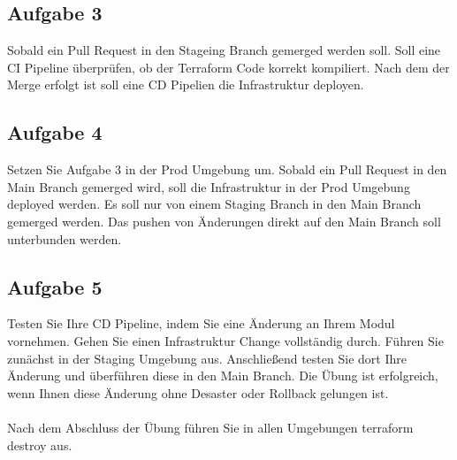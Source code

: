 \documentclass{article}
\begin{document}
    \subsection{Aufgabe 3}
    Sobald ein Pull Request in den Stageing Branch gemerged werden soll.  Soll eine CI Pipeline überprüfen, ob der Terraform Code korrekt kompiliert.
    Nach dem der Merge erfolgt ist soll eine CD Pipelien die Infrastruktur deployen.

    \subsection{Aufgabe 4}
    Setzen Sie Aufgabe 3 in der Prod Umgebung um. Sobald ein Pull Request in den Main Branch gemerged wird, soll die Infrastruktur in der Prod Umgebung deployed werden.
    Es soll nur von einem Staging Branch in den Main Branch gemerged werden. Das pushen von Änderungen direkt auf den Main Branch soll unterbunden werden.

    \subsection{Aufgabe 5}
    Testen Sie Ihre CD Pipeline, indem Sie eine Änderung an Ihrem Modul vornehmen.
    Gehen Sie einen Infrastruktur Change vollständig durch. Führen Sie zunächst in der Staging Umgebung aus. Anschließend testen Sie dort Ihre Änderung und überführen diese in den Main Branch.
    Die Übung ist erfolgreich, wenn Ihnen diese Änderung ohne Desaster oder Rollback gelungen ist. \\ \\
    Nach dem Abschluss der Übung führen Sie in allen Umgebungen terraform destroy aus.
\end{document}
